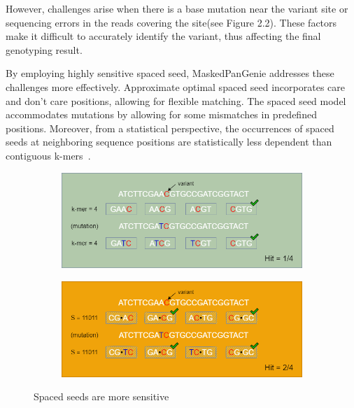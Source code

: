 \documentclass{PHlab-thesis}
\begin{document}
However, challenges arise when there is a base mutation near the variant site or sequencing errors in the reads covering the site(see Figure 2.2). These factors make it difficult to accurately identify the variant, thus affecting the final genotyping result.

By employing highly sensitive spaced seed, MaskedPanGenie addresses these challenges more effectively. Approximate optimal spaced seed incorporates care and don't care positions, allowing for flexible matching. The spaced seed model accommodates mutations by allowing for some mismatches in predefined positions. Moreover, from a statistical perspective, the occurrences of spaced seeds at neighboring sequence positions are statistically less dependent than contiguous k-mers~\cite{Girotto2018FSH}.\\
\begin{figure}
	\centering
    \begin{subfigure}[t]{0.48\textwidth}
        \centering
        \includegraphics[width=\textwidth]{figures/spaced_seed_mutation.drawio (5).png}
        \label{fig:MaskedPanGenie_fig1}
    \end{subfigure}
    \hfill
    \begin{subfigure}[t]{0.48\textwidth}
        \centering
        \includegraphics[width=\textwidth]{figures/spaced_seed_mutation.drawio (9).png}
        \label{fig:MaskedPanGenie_fig2}
    \end{subfigure}
    \caption{Spaced seeds are more sensitive}
\end{figure}
\end{document}
